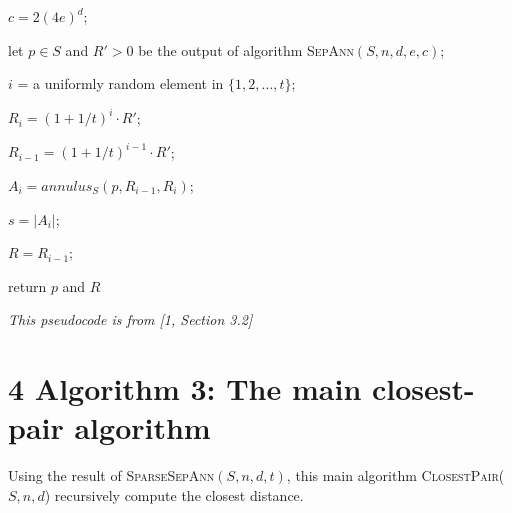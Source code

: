 \documentclass[12pt,english,]{article}
\let\origfigure\figure
\let\endorigfigure\endfigure
\renewenvironment{figure}[1][2] {
    \expandafter\origfigure\expandafter[H]
} {
    \endorigfigure
}
\begin{document}
\begin{figure}[ht] \centering
  \begin{minipage}{1\linewidth}
    {\LinesNotNumbered
    \begin{algorithm}[H]
    \SetAlgoLined
    \BlankLine

    \centering
    \begin{minipage}{.80\linewidth}
    $c = 2(4e)^d$;

    let $p\in S$ and $R' > 0$ be the output of algorithm \textsc{SepAnn$(S,n,d,e,c)$};

      {$i$ = a uniformly random element in $\{1, 2,\ldots, t\};$

      $R_i = (1+1/t)^i\cdot R'$;

      $R_{i-1} = (1+1/t)^{i-1}\cdot R'$;

      $A_i = annulus_S(p,R_{i-1},R_i)$;

      $s = |A_i|$;
      }
      $R = R_{i-1}$;

      return $p$ and $R$
    \end{minipage}
    \caption{\textsc{SparseSepAnn}$(S,n,d,t)$}
    \end{algorithm}}
  \end{minipage}
  \begin{minipage}{1\textwidth}
    \begin{flushright}
    {\footnotesize \emph{This pseudocode is from [1, Section 3.2]}\par}
    \end{flushright}
  \end{minipage}
\end{figure}

\hypertarget{algorithm-3-the-main-closest-pair-algorithm}{%
\section{\texorpdfstring{4 \enspace Algorithm 3: The main closest-pair
algorithm}{4 Algorithm 3: The main closest-pair algorithm}}\label{algorithm-3-the-main-closest-pair-algorithm}}

Using the result of \textsc{SparseSepAnn$(S,n,d,t)$}, this main
algorithm \textsc{ClosestPair($S,n,d$)} recursively compute the closest
distance.
\end{document}
